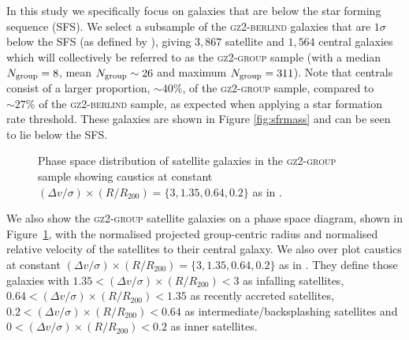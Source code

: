 \documentclass[useAMS,usenatbib]{mn2e}
\begin{document}
In this study we specifically focus on galaxies that are below the star forming sequence (SFS). We select a subsample of the \textsc{gz2-berlind} galaxies that are $1\sigma$ below the SFS (as defined by \citealt{peng10}), giving $3,867$ satellite and $1,564$ central galaxies which will collectively be referred to as the \textsc{gz2-group} sample (with a median $N_{\rm{group}}=8$, mean $N_{\rm{group}}\sim26$ and maximum $N_{\rm{group}}=311$). Note that centrals consist of a larger proportion, $\sim40\%$, of the \textsc{gz2-group} sample, compared to $\sim27\%$ of the \textsc{gz2-berlind} sample, as expected when applying a star formation rate threshold. These galaxies are shown in Figure \ref{fig:sfrmass} and can be seen to lie below the SFS.

\begin{figure}
\caption[]{Phase space distribution of satellite galaxies in the \textsc{gz2-group} sample showing caustics at constant $(\Delta v/\sigma)\times(R/R_{200}) = \{3, 1.35, 0.64, 0.2\}$ as in \cite{noble16}.}
\label{fig:phasespace}
\end{figure}

We also show the \textsc{gz2-group} satellite galaxies on a phase space diagram, shown in Figure~\ref{fig:phasespace}, with the normalised projected group-centric radius and normalised relative velocity of the satellites to their central galaxy. We also over plot caustics at constant $(\Delta v/\sigma)\times(R/R_{200}) = \{3, 1.35, 0.64, 0.2\}$ as in \cite{noble16}. They define those galaxies with $1.35<(\Delta v/\sigma)\times(R/R_{200})<3$ as infalling satellites, $0.64<(\Delta v/\sigma)\times(R/R_{200})<1.35$ as recently accreted satellites, $0.2<(\Delta v/\sigma)\times(R/R_{200})<0.64$ as intermediate/backsplashing satellites and $0<(\Delta v/\sigma)\times(R/R_{200})<0.2$ as inner satellites. 
\end{document}
